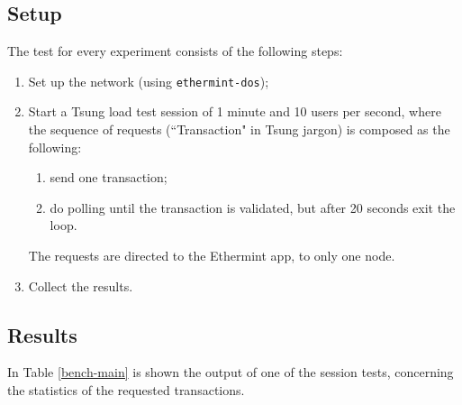 \documentclass[]{article}
\begin{document}
\subsection{Setup}
The test for every experiment consists of the following steps:
\begin{enumerate}
	\item Set up the network (using \texttt{ethermint-dos});
	\item Start a Tsung load test session of 1 minute and 10 users per second, where the sequence of requests (``Transaction" in Tsung jargon) is composed as the following:
	\begin{enumerate}
		\item send one transaction;
		\item do polling until the transaction is validated, but after 20 seconds exit the loop.
	\end{enumerate}
	The requests are directed to the Ethermint app, to only one node.
	\item Collect the results.
\end{enumerate}

\subsection{Results}

In Table \ref{bench-main} is shown the output of one of the session tests,  concerning the statistics of the requested transactions. 
\end{document}
